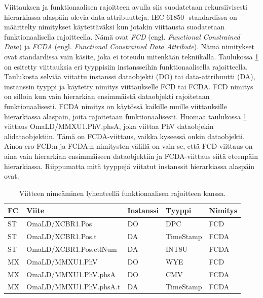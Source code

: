 Viittauksen ja funktionaalisen rajoitteen avulla siis suodatetaan rekursiivisesti hierarkiassa alaspäin olevia data-attribuutteja. IEC 61850 -standardissa on määritelty nimitykset käytettäväksi kun jotakin viittausta suodatetaan funktionaalisella rajoitteella. Nämä ovat \emph{FCD} (engl. \emph{Functional Constrained Data}) ja \emph{FCDA} (engl. \emph{Functional Constrained Data Attribute}). Nämä nimitykset ovat standardissa vain käsite, joka ei toteudu mitenkään tekniikalla. Taulukossa \ref{tab:fcd-ja-fcda} on esitetty viittauksia eri tyyppisiin instansseihin funktionaalisella rajoitteella. Taulukosta selviää viitattu instanssi dataobjekti (DO) tai data-attribuutti (DA), instanssin tyyppi ja käytetty nimitys viittaukselle FCD tai FCDA. FCD nimitys on silloin kun vain hierarkian ensimmäistä dataobjekti rajoitetaan funktionaalisesti. FCDA nimitys on käytössä kaikille muille viittauksille hierarkiassa alaspäin, joita rajoitetaan funktionaalisesti. Huomaa taulukossa \ref{tab:fcd-ja-fcda} viittaus OmaLD/MMXU1.PhV.phsA, joka viittaa PhV dataobjekin alidataobjektiin. Tämä on FCDA-viittaus, vaikka kyseessä onkin dataobjekti. Ainoa ero FCD:n ja FCDA:n nimitysten välillä on vain se, että FCD-viittaus on aina vain hierarkian ensimmäiseen dataobjektiin ja FCDA-viittaus siitä eteenpäin hierarkiassa. Riippumatta mitä tyyppejä viitatut instanssit hierarkiassa alaspäin ovat. \mbox{\cite[s.~55]{IEC61850-7-2}} \mbox{\cite[s.~63]{IEC61850-8-1}}

\begin{table}[ht!]
	\caption{Viitteen nimeäminen lyhenteellä funktionaalisen rajoitteen kanssa.}
	\label{tab:fcd-ja-fcda}
	\begin{tabular}{l | l | l | l | l}
		\hline
		\textbf{FC} & \textbf{Viite} & \textbf{Instanssi} & \textbf{Tyyppi} & \textbf{Nimitys} \\
		\hline \hline
		ST & OmaLD/XCBR1.Pos & DO & DPC & FCD \\
		ST & OmaLD/XCBR1.Pos.t & DA & TimeStamp & FCDA \\
		ST & OmaLD/XCBR1.Pos.ctlNum & DA & INT8U & FCDA \\
		MX & OmaLD/MMXU1.PhV & DO & WYE & FCD \\
		MX & OmaLD/MMXU1.PhV.phsA & DO & CMV & FCDA \\
		MX & OmaLD/MMXU1.PhV.phsA.t & DA & TimeStamp & FCDA \\
		\hline
	\end{tabular}
\end{table}

